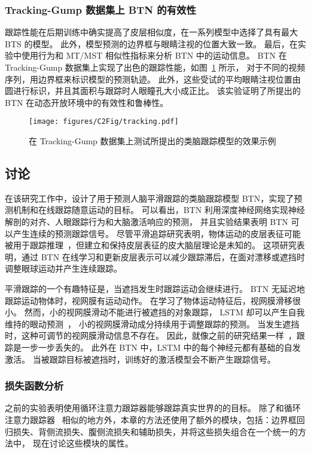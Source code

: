 \subsubsection{Tracking-Gump 数据集上 BTN 的有效性}
跟踪性能在后期训练中确实提高了皮层相似度，在一系列模型中选择了具有最大 BTS 的模型。
此外，模型预测的边界框与眼睛注视的位置大致一致。
最后，在实验中使用行为和 MT/MST 相似性指标来分析 BTN 中的运动信息。
BTN 在 Tracking-Gump 数据集上实现了出色的跟踪性能，如图~\ref{fig:tracking} 所示，
对于不同的视频序列，用边界框来标识模型的预测轨迹。
此外，这些受试的平均眼睛注视位置由圆进行标识，并且其面积与跟踪时人眼瞳孔大小成正比。
该实验证明了所提出的 BTN 在动态开放环境中的有效性和鲁棒性。

\begin{figure}[t]
	\centering
	\texttt{[image: figures/C2Fig/tracking.pdf]}
	\caption{
		在 Tracking-Gump 数据集上测试所提出的类脑跟踪模型的效果示例	
	}
	\label{fig:tracking}
\end{figure}

\subsection{讨论}

在该研究工作中，设计了用于预测人脑平滑跟踪的类脑跟踪模型 BTN，实现了预测机制和在线跟踪随意运动的目标。
可以看出，BTN 利用深度神经网络实现神经解剖的对齐、人眼跟踪行为和大脑激活响应的预测，
并且实验结果表明 BTN 可以产生连续的预测跟踪信号。
尽管平滑追踪研究表明，物体运动的皮层表征可能被用于跟踪推理~\cite{b21,b4,b3}，但建立和保持皮层表征的皮大脑层理论是未知的。
这项研究表明，通过 BTN 在线学习和更新皮层表示可以减少跟踪滞后，在面对漂移或遮挡时调整眼球运动并产生连续跟踪。

平滑跟踪的一个有趣特征是，当遮挡发生时跟踪运动会继续进行。
BTN 无延迟地跟踪运动物体时，视网膜有运动动作。
在学习了物体运动特征后，视网膜滑移很小。
然而，小的视网膜滑动不能进行被遮挡的对象跟踪，
LSTM 却可以产生自我维持的眼动预测~\cite{kashyap2018a}，
小的视网膜滑动成分持续用于调整跟踪的预测。
当发生遮挡时，这种可调节的视网膜滑动信息不存在。
因此，就像之前的研究结果一样~\cite{b4}，跟踪是一步一步丢失的。
此外在 BTN 中，LSTM 中的每个神经元都有基础的自发激活。
当被跟踪目标被遮挡时，训练好的激活模型会不断产生跟踪信号。

\subsubsection{损失函数分析}
之前的实验表明使用循环注意力跟踪器能够跟踪真实世界的的目标。
除了和循环注意力跟踪器~\cite{ratm} 相似的地方外，本章的方法还使用了额外的模块，包括：边界框回归损失、背侧流损失、腹侧流损失和辅助损失，并将这些损失组合在一个统一的方法中，
现在讨论这些模块的属性。

